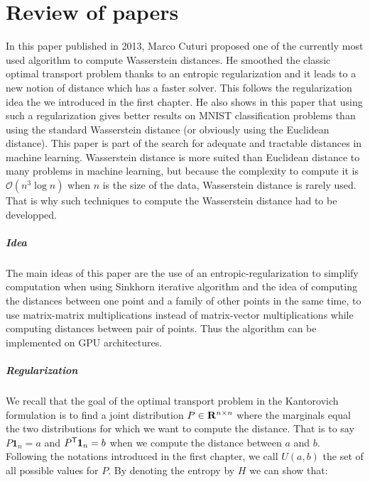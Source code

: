\chapter{Review of papers}

\myminitoc


In this paper published in 2013, Marco Cuturi proposed one of the currently
most used algorithm to compute Wasserstein distances. He smoothed the classic
optimal transport problem thanks to an entropic regularization and it leads
to a new notion of distance which has a faster solver. This follows the
regularization idea the we introduced in the first chapter. He also shows
in this paper that using such a regularization gives better results on
MNIST classification problems than using the standard Wasserstein distance
(or obviously using the Euclidean distance). This paper is part of the search
for adequate and tractable distances in machine learning. Wasserstein distance
is more suited than Euclidean distance to many problems in machine learning,
but because the complexity to compute it is $\mathcal{O}(n^3 \log n)$ when
$n$ is the size of the data, Wasserstein distance is rarely used. That is
why such techniques to compute the Wasserstein distance had to be developped.

\paragraph{Idea}
The main ideas of this paper are the use of an entropic-regularization to
simplify computation when using Sinkhorn iterative algorithm and the idea
of computing the distances between one point and a family of other points in
the same time, to use matrix-matrix multiplications instead of matrix-vector
multiplications while computing distances between pair of points. Thus the
algorithm can be implemented on GPU architectures.

\paragraph{Regularization}
We recall that the goal of the optimal transport problem in the Kantorovich
formulation is to find a joint distribution $P \in \mathbf{R}^{n \times n}$ where
the marginals equal the two distributions for which we want to compute the
distance. That is to say $P \mathbf{1}_n = a$ and $P^{\mathsf{T}} \mathbf{1}_n = b$
when we compute the distance between $a$ and $b$. Following the notations
introduced in the first chapter, we call $U(a, b)$ the set of all possible
values for $P$. By denoting the entropy by $H$ we can show that:

